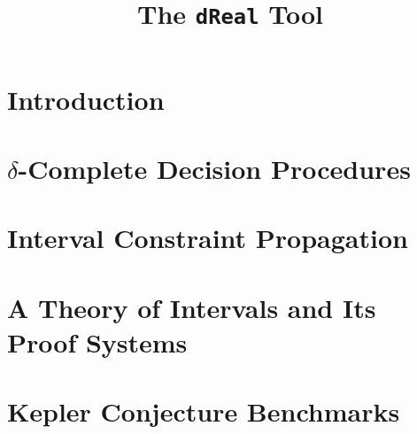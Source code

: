 \documentclass[envcountsect]{llncs}
\title{The {\tt dReal} Tool}
\author{}
\institute{Carnegie Mellon University, Pittsburgh, PA 15213}
\begin{document}
\maketitle

\begin{abstract}
\end{abstract}

\section{Introduction}

\section{$\delta$-Complete Decision Procedures}

\section{Interval Constraint Propagation}

\section{A Theory of Intervals and Its Proof Systems}

\section{Kepler Conjecture Benchmarks}






\end{document}
